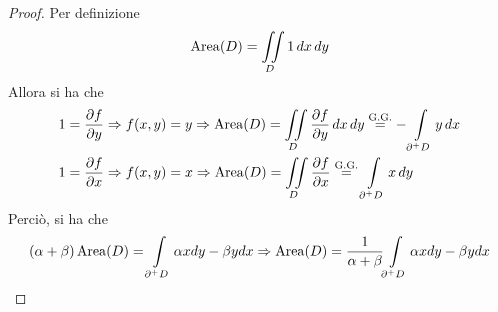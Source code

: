 \begin{proof}
    Per definizione 
    \begin{equation*}
        \operatorname{Area}(D)= \iint\limits_{D}{1}\,dx\, dy
    \end{equation*}
    Allora si ha che
    \begin{align}
        &1= \frac{\partial f}{\partial y} \Rightarrow f(x,y)= y \Rightarrow \operatorname{Area}(D)= \iint\limits_{D} \frac{\partial f}{\partial y}\,dx\,dy \overset{\text{G.G.}}{=}  -\int\limits_{\partial^+ D}{y}\,dx\\
      &  1=\frac{\partial f}{\partial x} \Rightarrow f(x,y)= x \Rightarrow \operatorname{Area}(D)= \iint\limits_{D} \frac{\partial f}{\partial x} \overset{\text{G.G.}}{=}  \int\limits_{\partial^+ D}{x}\,dy
    \end{align}
    Perciò, si ha che
    \begin{equation*}
        (\alpha+\beta)\operatorname{Area}(D)= \int\limits_{\partial^+ D}{\alpha x dy - \beta y dx} \Rightarrow \operatorname{Area}(D)=  \frac{1}{\alpha+\beta}{\int\limits_{\partial^+ D}{\alpha x dy - \beta y dx}}
    \end{equation*}
\end{proof}